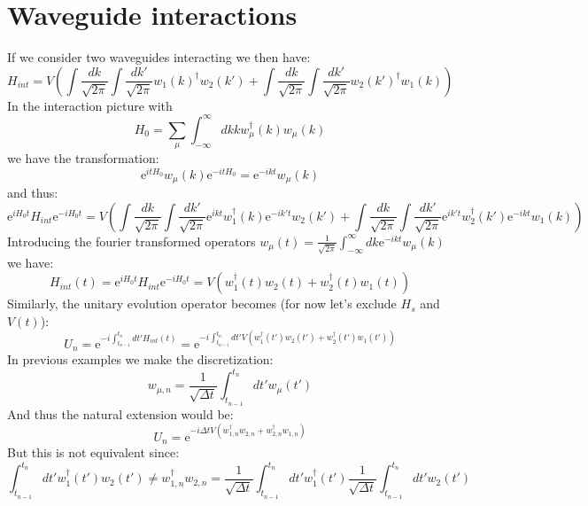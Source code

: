 \section{Waveguide interactions}
If we consider two waveguides interacting we then have:
\begin{equation}
    H_{int} = V \left ( \int \frac{dk}{\sqrt{2 \pi}} \int \frac{dk'}{\sqrt{2 \pi}} w_{1}(k)^\dagger w_{2}(k') + \int \frac{dk}{\sqrt{2 \pi}} \int \frac{dk'}{\sqrt{2 \pi}} w_{2}(k')^\dagger w_{1}(k)\right )
\end{equation}
In the interaction picture with
\begin{equation}
    H_0 = \sum_\mu \int_{-\infty}^\infty d k k w^\dagger_\mu(k)w_\mu(k)
\end{equation}
we have the transformation: 
\begin{equation}
    \mathrm{e}^{i t H_0} w_\mu(k) \mathrm{e}^{-i t H_0} = \mathrm{e}^{-ikt} w_\mu(k)
\end{equation}
and thus:
\begin{equation}
    \mathrm{e}^{i H_0 t } H_{int} \mathrm{e}^{-i H_0 t } = V \left ( \int \frac{dk}{\sqrt{2 \pi}} \int \frac{dk'}{\sqrt{2 \pi}} \mathrm{e}^{ikt} w^\dagger_{1}(k) \mathrm{e}^{-ik't} w_{2}(k') + \int \frac{dk}{\sqrt{2 \pi}} \int \frac{dk'}{\sqrt{2 \pi}} \mathrm{e}^{ik't} w^\dagger_{2}(k') \mathrm{e}^{-ikt} w_{1}(k)\right )
\end{equation}
Introducing the fourier transformed operators $w_\mu(t) = \frac{1}{\sqrt{2 \pi}} \int_{-\infty}^\infty d k \mathrm{e}^{-ikt} w_{\mu}(k)$ we have: 
\begin{equation}
    H_{int}(t)  = \mathrm{e}^{i H_0 t } H_{int} \mathrm{e}^{-i H_0 t } = V \left ( w_1^\dagger(t) w_2(t) + w_2^\dagger(t) w_1(t)\right )
\end{equation}
Similarly, the unitary evolution operator becomes (for now let's exclude $H_s$ and $V(t)$):
\begin{equation}
    U_n = \mathrm{e}^{- i \int_{t_{n-1}}^{t_n} dt' H_{int}(t)} = \mathrm{e}^{- i \int_{t_{n-1}}^{t_n} dt' V \left ( w_1^\dagger(t') w_2(t') + w_2^\dagger(t') w_1(t')\right )}
\end{equation}
In previous examples we make the discretization:
\begin{equation}
    w_{\mu,n} = \frac{1}{\sqrt{\Delta t}} \int_{t_{n-1}}^{t_n} d t' w_{\mu}(t')
\end{equation}
And thus the natural extension would be:
\begin{equation}
    U_n = \mathrm{e}^{- i \Delta t V \left ( w^\dagger_{1,n} w_{2,n} + w_{2,n}^\dagger w_{1,n}\right )}
\end{equation}
But this is not equivalent since:
\begin{equation}
   \int_{t_{n-1}}^{t_n} dt' w_1^\dagger(t') w_2(t') \neq  w^\dagger_{1,n} w_{2,n} = \frac{1}{\sqrt{\Delta t}} \int_{t_{n-1}}^{t_n} d t' w^\dagger_{1}(t') \frac{1}{\sqrt{\Delta t}} \int_{t_{n-1}}^{t_n} d t' w_{2}(t')
\end{equation}





